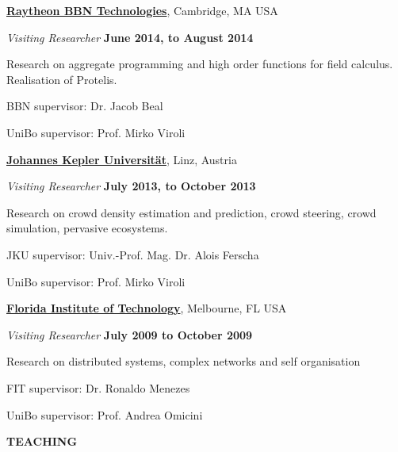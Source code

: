 \documentclass[10pt]{article}
\newenvironment{outerlist}[1][\enskip\textbullet]%
        {\begin{itemize}[#1]}{\end{itemize}%
         \vspace{-.6\baselineskip}}
\newenvironment{innerlist}[1][\enskip\textbullet]%
        {\begin{compactitem}[#1]}{\end{compactitem}}
\newcommand{\halfblankline}{\quad\vspace{-0.5\baselineskip}\pagebreak[3]}
\newcommand{\macrosection}[1]{

\vspace{20pt}
\hrulefill
\begin{center}
\textbf{#1}
\end{center}
\vspace{-7pt}
\hrulefill
}
\begin{document}
\href{http://www.bbn.com/}{\textbf{Raytheon BBN Technologies}}, Cambridge, MA USA
\begin{outerlist}
\item[] \textit{Visiting Researcher} \hfill \textbf{June 2014, to August 2014}
    \begin{innerlist}
      \item Research on aggregate programming and high order functions for field calculus. Realisation of Protelis.
      \item BBN supervisor: Dr. Jacob Beal
      \item UniBo supervisor: Prof. Mirko Viroli
    \end{innerlist}
\halfblankline
\end{outerlist}

\href{http://www.jku.at/}{\textbf{Johannes Kepler Universität}}, Linz, Austria
\begin{outerlist}
\item[] \textit{Visiting Researcher} \hfill \textbf{July 2013, to October 2013}
    \begin{innerlist}
      \item Research on crowd density estimation and prediction, crowd steering, crowd simulation, pervasive ecosystems.
      \item JKU supervisor: Univ.-Prof. Mag. Dr. Alois Ferscha
      \item UniBo supervisor: Prof. Mirko Viroli
    \end{innerlist}
\halfblankline
\end{outerlist}

\href{http://www.fit.edu/}{\textbf{Florida Institute of Technology}}, Melbourne, FL USA
\begin{outerlist}
\item[] \textit{Visiting Researcher} \hfill \textbf{July 2009 to October 2009}
    \begin{innerlist}
      \item Research on distributed systems, complex networks and self organisation
      \item FIT supervisor: Dr. Ronaldo Menezes
      \item UniBo supervisor: Prof. Andrea Omicini
    \end{innerlist}
\halfblankline
\end{outerlist}

\newpage
\macrosection{TEACHING}


\end{document}
